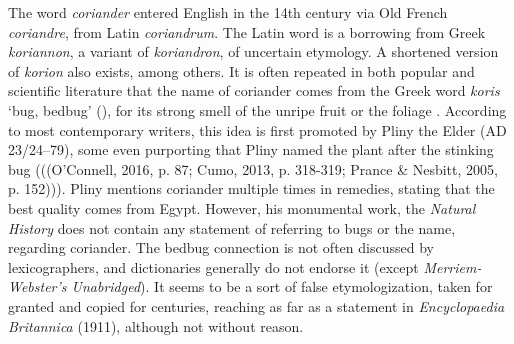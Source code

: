 The word \textit{coriander} entered English in the 14th century via Old French \textit{coriandre}, from Latin \textit{coriandrum}. The Latin word is a borrowing from Greek \textit{koriannon}, a variant of \textit{koriandron}, of uncertain etymology. A shortened version of \textit{korion} also exists, among others. It is often repeated in both popular and scientific literature that the name of coriander comes from the Greek word \textit{koris} `bug, bedbug' (), for its strong smell of the unripe fruit or the foliage \parencite[cf.][]{harper_coriander_nodate}. According to most contemporary writers, this idea is first promoted by Pliny the Elder (AD 23/24–79), some even purporting that Pliny named the plant after the stinking bug \parencite{oconnell_book_2016, cumo_encyclopedia_2013, prance_cultural_2005} (((O’Connell, 2016, p. 87; Cumo, 2013, p. 318-319; Prance \& Nesbitt, 2005, p. 152))). Pliny mentions coriander multiple times in remedies, stating that the best quality comes from Egypt. However, his monumental work, the \textit{Natural History} \parencite{pliny_the_elder_natural_1855} does not contain any statement of referring to bugs or the name, regarding coriander. The bedbug connection is not often discussed by lexicographers, and dictionaries generally do not endorse it (except \textit{Merriem-Webster’s Unabridged}). It seems to be a sort of false etymologization, taken for granted and copied for centuries, reaching as far as a statement in \textit{Encyclopaedia Britannica} (1911), although not without reason.

